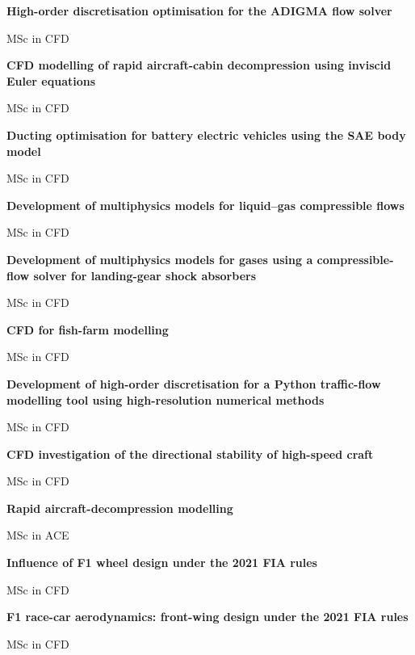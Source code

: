 \documentclass[11pt,a4paper]{article}
\newlength{\cventrysep}
\newenvironment{cventry}{%
  \par\noindent\begin{minipage}{\linewidth}
  \RaggedRight\fontsize{9.8}{12.5}\selectfont
}{\end{minipage}\par\addvspace{\cventrysep}}
\newcommand{\cvtitle}[1]{{\bfseries #1\par}\vspace{1pt}}
\newcommand{\cvmeta}[1]{{\fontsize{9}{11.5}\selectfont\color{Muted}#1\par}\vspace{1pt}}
\begin{document}
\begin{cventry}
\cvtitle{High-order discretisation optimisation for the ADIGMA flow solver}
\cvmeta{MSc in CFD}
\end{cventry}

\begin{cventry}
\cvtitle{CFD modelling of rapid aircraft-cabin decompression using inviscid Euler equations}
\cvmeta{MSc in CFD}
\end{cventry}

\begin{cventry}
\cvtitle{Ducting optimisation for battery electric vehicles using the SAE body model}
\cvmeta{MSc in CFD}
\end{cventry}

\begin{cventry}
\cvtitle{Development of multiphysics models for liquid--gas compressible flows}
\cvmeta{MSc in CFD}
\end{cventry}

\begin{cventry}
\cvtitle{Development of multiphysics models for gases using a compressible-flow solver for landing-gear shock absorbers}
\cvmeta{MSc in CFD}
\end{cventry}

\begin{cventry}
\cvtitle{CFD for fish-farm modelling}
\cvmeta{MSc in CFD}
\end{cventry}

\begin{cventry}
\cvtitle{Development of high-order discretisation for a Python traffic-flow modelling tool using high-resolution numerical methods}
\cvmeta{MSc in CFD}
\end{cventry}

\begin{cventry}
\cvtitle{CFD investigation of the directional stability of high-speed craft}
\cvmeta{MSc in CFD}
\end{cventry}

\begin{cventry}
\cvtitle{Rapid aircraft-decompression modelling}
\cvmeta{MSc in ACE}
\end{cventry}

\begin{cventry}
\cvtitle{Influence of F1 wheel design under the 2021 FIA rules}
\cvmeta{MSc in CFD}
\end{cventry}

\begin{cventry}
\cvtitle{F1 race-car aerodynamics: front-wing design under the 2021 FIA rules}
\cvmeta{MSc in CFD}
\end{cventry}
\end{document}
